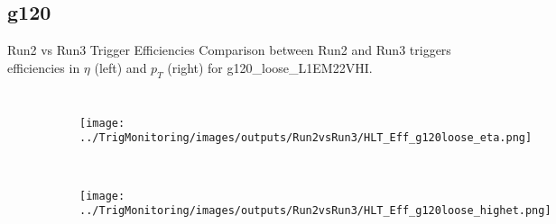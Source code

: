 \documentclass[aspectratio=1610,8pt]{beamer}					%
\begin{document}
\subsection{g120}
\begin{frame}{Run2 vs Run3 Trigger Efficiencies}
    Comparison between Run2 and Run3 triggers efficiencies in $\eta$ (left) and $p_T$ (right) for g120\_loose\_L1EM22VHI.
    \begin{columns}
        \begin{figure}[h!]
            \centering
            \begin{subfigure}[b]{.45\textwidth}
                \centering
                \texttt{[image: ../TrigMonitoring/images/outputs/Run2vsRun3/HLT\_Eff\_g120loose\_eta.png]}
                \caption{~}
            \end{subfigure}
            \hfill
            \begin{subfigure}[b]{.45\textwidth}
                \centering
                \texttt{[image: ../TrigMonitoring/images/outputs/Run2vsRun3/HLT\_Eff\_g120loose\_highet.png]}
                \caption{~}
            \end{subfigure}
            \hfill
        \end{figure}
        

\end{columns}
\end{frame}
\end{document}
